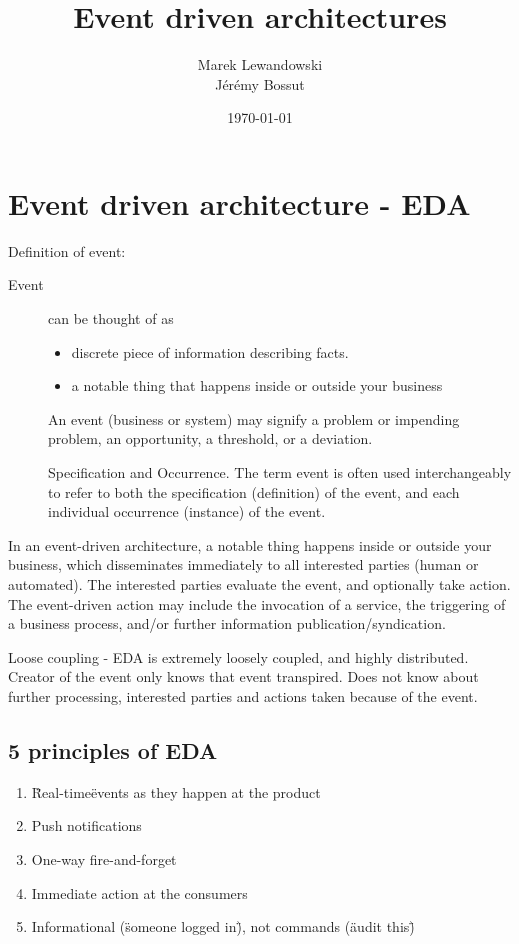 \documentclass[12pt, a4paper]{article}
\author{Marek Lewandowski \\ Jérémy Bossut}
\date{\today}
\title{Event driven architectures}
\begin{document}
\maketitle
\newpage

\section{Event driven architecture - EDA}
Definition of event:

\begin{description}
\item[Event] can be thought of as
\begin{itemize}
 \item discrete piece of information describing facts. 
 \item a notable thing that happens inside or outside your business
 \end{itemize}

 An event (business or system) may signify a problem or impending problem, an opportunity, a threshold, or a deviation.

 Specification and Occurrence. The term event is often used interchangeably to refer to both the specification (definition) of the event, and each individual occurrence (instance) of the event.

\end{description}

In an event-driven architecture, a notable thing happens inside or outside your business, which disseminates immediately to all interested parties (human or automated). The interested parties evaluate the event, and optionally take action. The event-driven action may include the invocation of a service, the triggering of a business process, and/or further information publication/syndication.

Loose coupling - EDA is extremely loosely coupled, and highly distributed. Creator of the event only knows that event transpired. Does not know about further processing, interested parties and actions taken because of the event.

\subsection{5 principles of EDA}
\begin{enumerate}
\item \"Real-time\" events as they happen at the product
\item Push notifications
\item One-way fire-and-forget
\item Immediate action at the consumers 
\item Informational (\"someone logged in\"), not commands (\"audit this\") 
\end{enumerate}
\end{document}
